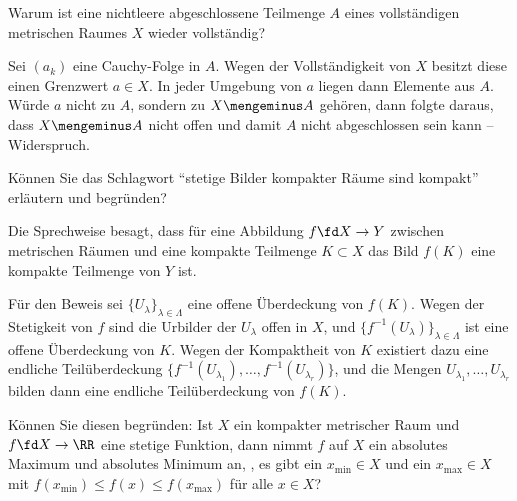 \begin{frage}\label{09_vollstteilraum}
  Warum ist eine nichtleere abgeschlossene Teilmenge $A$ eines 
  vollständigen metrischen Raumes $X$ wieder vollständig?
\end{frage}

\begin{antwort}
  Sei $(a_k)$ eine Cauchy-Folge in $A$. Wegen der Vollständigkeit von $X$ 
  besitzt diese einen Grenzwert $a\in X$. In jeder Umgebung 
  von $a$ liegen dann Elemente aus $A$. 
  Würde $a$ nicht zu $A$, sondern zu $X\mengeminus A$ 
  gehören, dann folgte daraus, dass $X\mengeminus A$ 
  nicht offen und damit $A$ nicht abgeschlossen sein kann -- Widerspruch.
  \AntEnd
\end{antwort}

\begin{frage}\label{09_schlagwort}
  Können Sie das Schlagwort "`stetige Bilder kompakter Räume sind kompakt"' 
  erläutern und begründen?
\end{frage}

\begin{antwort}
  
  Die Sprechweise besagt, dass für eine  Abbildung 
  $f\fd X\to Y$ zwischen metrischen Räumen und eine kompakte 
  Teilmenge $K\subset X$ das Bild $f(K)$ eine kompakte Teilmenge 
  von $Y$ ist. 

  Für den Beweis sei $\{ U_\lambda \}_{\lambda\in\Lambda}$ 
  eine offene Überdeckung 
  von $f(K)$. Wegen der Stetigkeit von $f$ sind die Urbilder 
  der $U_\lambda$ offen in $X$, und 
  $\{ f^{-1} (U_\lambda) \}_{\lambda\in\Lambda}$ ist eine 
  offene Überdeckung von $K$. Wegen der Kompaktheit von $K$ existiert 
  dazu eine endliche Teilüberdeckung 
  $\{ f^{-1} (U_{\lambda_1}), \ldots, f^{-1} (U_{\lambda_r}) \}$, 
  und die Mengen $U_{\lambda_1}, \ldots, U_{\lambda_r} $ bilden 
  dann eine endliche Teilüberdeckung von $f(K)$. \AntEnd
\end{antwort}

\begin{frage}
  Können Sie diesen  begründen: Ist $X$ ein 
  kompakter metrischer Raum und $f\fd X\to\RR$ eine stetige Funktion, 
  dann nimmt $f$ auf $X$ ein absolutes Maximum und absolutes Minimum 
  an, {\dasheisst}, es gibt ein $x_{\min} \in X$ und ein $x_{\max} \in X$ 
  mit $f( x_{\min} ) \le  f(x)  \le f( x_{\max} )$ für alle 
  $x\in X$?
\end{frage}


